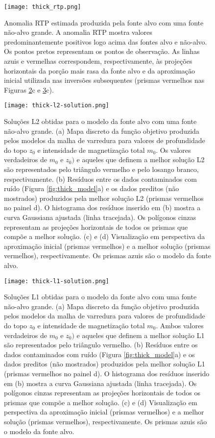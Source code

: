 \begin{figure}[!htb]
	\centering
	\texttt{[image: thick\_rtp.png]}
	\caption{Anomalia RTP estimada produzida pela fonte alvo com uma fonte não-alvo grande. 
		A anomalia RTP mostra valores predominantemente positivos logo acima das fontes alvo e não-alvo. Os pontos pretos representam os pontos de observação. As linhas azuis e vermelhas correspondem, respectivamente, às projeções horizontais da porção mais rasa da fonte alvo e da aproximação inicial utilizada nas inversões subsequentes (prismas vermelhos nas Figuras \ref{fig:thick_l2_result}c e 
		\ref{fig:thick_l1_result}c).
	}
	\label{fig:thick_model_rtp}
\end{figure}
\pagebreak
\begin{figure}[!htb]
	\centering
	\texttt{[image: thick-l2-solution.png]}
	\caption{Soluções L2 obtidas para o modelo da fonte alvo com uma fonte não-alvo grande. 
	(a) Mapa discreto da função objetivo produzida pelos modelos da malha de varredura para valores de profundidade do topo $z_{0}$ e intensidade de magnetização total $m_{0}$. 
	Os valores verdadeiros de $m_{0}$ e $z_{0})$ e aqueles que definem a melhor solução L2 são representados pelo triângulo vermelho e pelo losango branco, respectivamente.
	(b) Resíduos entre os dados contaminados com ruído (Figura \ref{fig:thick_model}a) 
	e os dados preditos (não mostrados) produzidos pela melhor solução L2 (prismas vermelhos no painel d). 
	O histograma dos resíduos inserido em (b) mostra a curva Gaussiana ajustada (linha tracejada).
	Os polígonos cinzas representam as projeções horizontais de todos os prismas que compõe a melhor solução. 
	(c) e (d) Visualização em perspectiva da aproximação inicial (prismas vermelhos) e 
	a melhor solução (prismas vermelhos), respectivamente. Os prismas azuis são o modelo da fonte alvo. 
	}
	\label{fig:thick_l2_result}
\end{figure}
\pagebreak
\begin{figure}[!htb]
	\centering
	\texttt{[image: thick-l1-solution.png]}
	\caption{Soluções L1 obtidas para o modelo da fonte alvo com uma fonte não-alvo grande. 
		(a) Mapa discreto da função objetivo produzida pelos modelos da malha de varredura para valores de profundidade do topo $z_{0}$ e intensidade de magnetização total $m_{0}$. 
		Ambos valores verdadeiros de $m_{0}$ e $z_{0})$ e aqueles que definem a melhor solução L1 são representados pelo triângulo vermelho.
		(b) Resíduos entre os dados contaminados com ruído (Figura \ref{fig:thick_model}a) 
		e os dados preditos (não mostrados) produzidos pela melhor solução L1 (prismas vermelhos no painel d). 
		O histograma dos resíduos inserido em (b) mostra a curva Gaussiana ajustada (linha tracejada).
		Os polígonos cinzas representam as projeções horizontais de todos os prismas que compõe a melhor solução. 
		(c) e (d) Visualização em perspectiva da aproximação inicial (prismas vermelhos) e 
		a melhor solução (prismas vermelhos), respectivamente. Os prismas azuis são o modelo da fonte alvo. 
	}
	\label{fig:thick_l1_result}
\end{figure}
\pagebreak